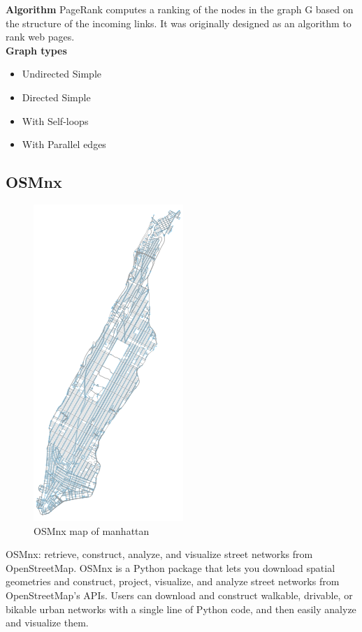 {\bf Algorithm}
PageRank computes a ranking of the nodes in the graph G based on the structure of the incoming links. It was originally designed as an algorithm to rank web pages.\\


{\bf Graph types}
\begin{itemize}
\item Undirected Simple
\item Directed Simple
\item With Self-loops
\item With Parallel edges

\end{itemize}

\subsection{OSMnx}

\begin{figure}[h]
\centering \includegraphics[scale=0.50]{input/images/osmnx.png}
\caption{OSMnx map of manhattan}
\end{figure}
OSMnx: retrieve, construct, analyze, and visualize street networks from OpenStreetMap. OSMnx is a Python package that lets you download spatial geometries and construct, project, visualize, and analyze street networks from OpenStreetMap’s APIs. Users can download and construct walkable, drivable, or bikable urban networks with a single line of Python code, and then easily analyze and visualize them.\\

